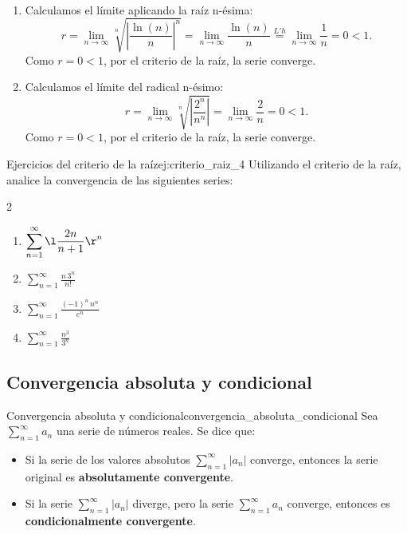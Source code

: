 \begin{soln}
    $\left. \right.$
    \begin{enumerate}
        \item Calculamos el límite aplicando la raíz n-ésima:
        \[ r = \lim_{n \to \infty} \sqrt[n]{\left|\frac{\ln(n)}{n}\right|^n} = \lim_{n \to \infty} \frac{\ln(n)}{n} \overset{L'h}{=} \lim_{n \to \infty} \frac{1}{n} = 0 < 1. \]
        Como $r = 0 < 1$, por el criterio de la raíz, la serie converge.
        
        \item Calculamos el límite del radical n-ésimo:
        \[ r = \lim_{n \to \infty} \sqrt[n]{\left|\frac{2^n}{n^n}\right|} = \lim_{n \to \infty} \frac{2}{n} = 0 < 1. \]
        Como $r = 0 < 1$, por el criterio de la raíz, la serie converge.
    \end{enumerate}
\end{soln}

\begin{problem}{Ejercicios del criterio de la raíz}{ej:criterio_raiz_4}
    Utilizando el criterio de la raíz, analice la convergencia de las siguientes series:
    \begin{multicols}{2}
        \begin{enumerate}
            \item $\displaystyle \sum_{n=1}^{\infty} \l \frac{2n}{n+1} \r^n$
            \item $\displaystyle \sum_{n=1}^{\infty} \frac{n \, 3^n}{n!}$
            \item $\displaystyle \sum_{n=1}^{\infty} \frac{(-1)^n \, n^n}{e^n}$
            \item $\displaystyle \sum_{n=1}^{\infty} \frac{n^3}{3^n}$
        \end{enumerate}
    \end{multicols}
\end{problem}

\subsection{Convergencia absoluta y condicional}

\begin{definition}{Convergencia absoluta y condicional}{convergencia_absoluta_condicional}
    Sea $\displaystyle \sum_{n=1}^{\infty}a_n$ una serie de números reales. Se dice que:
    \begin{itemize}
        \item Si la serie de los valores absolutos $\displaystyle \sum_{n=1}^{\infty}|a_n| $ converge, entonces la serie original es \textbf{absolutamente convergente}.
        \item Si la serie $\displaystyle \sum_{n=1}^{\infty}|a_n|$ diverge, pero la serie $\displaystyle \sum_{n=1}^{\infty}a_n$ converge, entonces es \textbf{condicionalmente convergente}.
    \end{itemize}
\end{definition}

